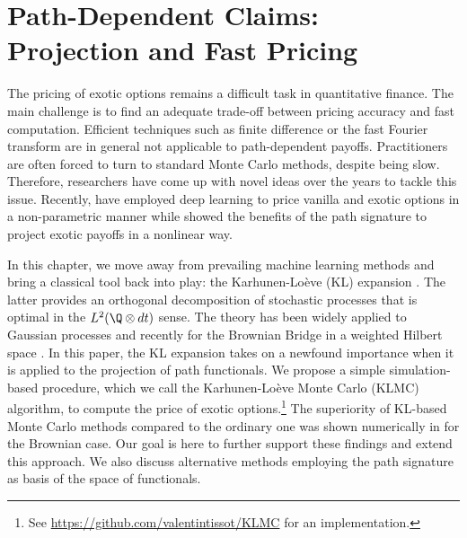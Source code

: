 \chapter{Path-Dependent Claims: Projection and Fast Pricing}

The pricing of exotic 
options remains a difficult task in quantitative finance. The main challenge is to find an adequate trade-off between pricing accuracy and fast computation. Efficient techniques such as finite difference \cite{Schwartz} or the fast Fourier transform \cite{Carr} are in general not applicable to path-dependent payoffs. Practitioners are often forced to turn to  standard Monte Carlo methods, despite being  slow. 
Therefore, researchers have come up with novel ideas over the years to tackle this issue.   
Recently, \citet{Hull} have employed deep learning to price vanilla and exotic options in a non-parametric manner while \citet{Szpruch,LyonsNum}
showed the benefits of the path signature  to project exotic payoffs in a nonlinear way. 

In this chapter, we move away from  prevailing machine learning methods and bring a classical tool  back into play: the Karhunen-Loève (KL) expansion \cite{Karhunen, Loeve}. The latter provides an  orthogonal decomposition of stochastic processes that is optimal in the $L^2(\Q \otimes dt)$ sense. %
The theory has been widely applied to Gaussian processes \cite{Ghanem,Solin}  and  recently for the Brownian Bridge in a weighted Hilbert space \cite{Foster}. 
In this paper, the KL expansion takes on a newfound importance when it is applied to the projection of path functionals. We propose a simple simulation-based procedure, which we call the Karhunen-Loève Monte Carlo (KLMC) algorithm, to  compute the price  of exotic options.\footnote{See \href{https://github.com/valentintissot/KLMC.git}{https://github.com/valentintissot/KLMC} for an implementation.}
The superiority of KL-based Monte Carlo methods compared to the ordinary one was shown numerically in \cite{Acworth} for  the Brownian case. Our goal is here to further support these findings and 
extend this approach. We also discuss alternative methods employing the path signature as basis of the space of functionals. 





